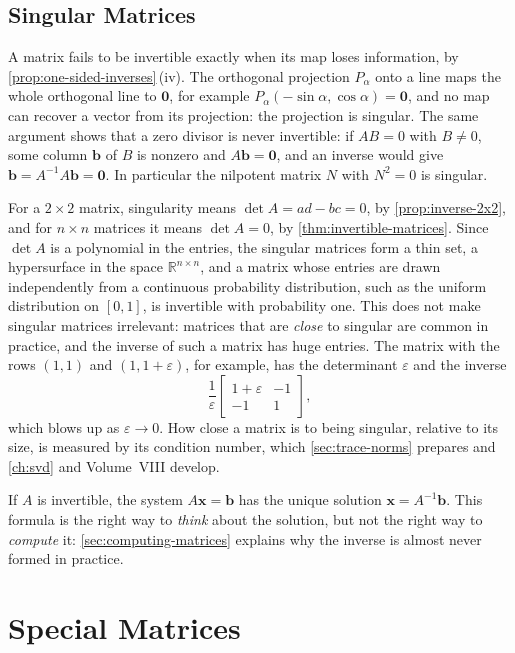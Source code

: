 \subsection{Singular Matrices}

A matrix fails to be invertible exactly when its map loses information, by \cref{prop:one-sided-inverses}\,(iv). The orthogonal projection $P_\alpha$ onto a line maps the whole orthogonal line to $\mathbf 0$, for example $P_\alpha(-\sin\alpha,\cos\alpha)=\mathbf 0$, and no map can recover a vector from its projection: the projection is singular. The same argument shows that a zero divisor is never invertible: if $AB=0$ with $B\ne0$, some column $\mathbf b$ of $B$ is nonzero and $A\mathbf b=\mathbf 0$, and an inverse would give $\mathbf b=A^{-1}A\mathbf b=\mathbf 0$. In particular the nilpotent matrix $N$ with $N^2=0$ is singular.

For a $2\times2$ matrix, singularity means $\det A=ad-bc=0$, by \cref{prop:inverse-2x2}, and for $n\times n$ matrices it means $\det A=0$, by \cref{thm:invertible-matrices}. Since $\det A$ is a polynomial in the entries, the singular matrices form a thin set, a hypersurface in the space $\mathbb R^{n\times n}$, and a matrix whose entries are drawn independently from a continuous probability distribution, such as the uniform distribution on $[0,1]$, is invertible with probability one. This does not make singular matrices irrelevant: matrices that are \emph{close} to singular are common in practice, and the inverse of such a matrix has huge entries. The matrix with the rows $(1,1)$ and $(1,1+\varepsilon)$, for example, has the determinant $\varepsilon$ and the inverse
\[
\frac1\varepsilon\begin{bmatrix}1+\varepsilon&-1\\-1&1\end{bmatrix},
\]
which blows up as $\varepsilon\to0$. How close a matrix is to being singular, relative to its size, is measured by its condition number, which \cref{sec:trace-norms} prepares and \cref{ch:svd} and Volume~VIII develop.

If $A$ is invertible, the system $A\mathbf x=\mathbf b$ has the unique solution $\mathbf x=A^{-1}\mathbf b$. This formula is the right way to \emph{think} about the solution, but not the right way to \emph{compute} it: \cref{sec:computing-matrices} explains why the inverse is almost never formed in practice.

\section{Special Matrices}
\label{sec:special-matrices}

